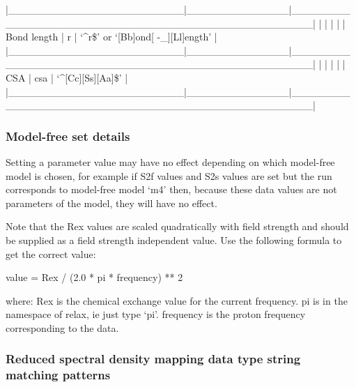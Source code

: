 |\_\_\_\_\_\_\_\_\_\_\_\_\_\_\_\_\_\_\_\_\_\_\_\_|\_\_\_\_\_\_\_\_\_\_\_\_\_\_|\_\_\_\_\_\_\_\_\_\_\_\_\_\_\_\_\_\_\_\_\_\_\_\_\_\_\_\_\_\_\_\_\_\_\_\_\_\_\_\_\_\_\_\_\_\_\_\_\_\_|
|                        |              |                                                  |
| Bond length            | r            | `\^{}r\$' or `[Bb]ond[ -\_][Ll]ength'                 |
|\_\_\_\_\_\_\_\_\_\_\_\_\_\_\_\_\_\_\_\_\_\_\_\_|\_\_\_\_\_\_\_\_\_\_\_\_\_\_|\_\_\_\_\_\_\_\_\_\_\_\_\_\_\_\_\_\_\_\_\_\_\_\_\_\_\_\_\_\_\_\_\_\_\_\_\_\_\_\_\_\_\_\_\_\_\_\_\_\_|
|                        |              |                                                  |
| CSA                    | csa          | `\^{}[Cc][Ss][Aa]\$'                                 |
|\_\_\_\_\_\_\_\_\_\_\_\_\_\_\_\_\_\_\_\_\_\_\_\_|\_\_\_\_\_\_\_\_\_\_\_\_\_\_|\_\_\_\_\_\_\_\_\_\_\_\_\_\_\_\_\_\_\_\_\_\_\_\_\_\_\_\_\_\_\_\_\_\_\_\_\_\_\_\_\_\_\_\_\_\_\_\_\_\_|



\subsubsection{Model-free set details}

Setting a parameter value may have no effect depending on which model-free model is chosen,
for example if S2f values and S2s values are set but the run corresponds to model-free model
`m4' then, because these data values are not parameters of the model, they will have no
effect.

Note that the Rex values are scaled quadratically with field strength and should be supplied
as a field strength independent value.  Use the following formula to get the correct value:

    value = Rex / (2.0 * pi * frequency) ** 2

where:
    Rex is the chemical exchange value for the current frequency.
    pi is in the namespace of relax, ie just type `pi'.
    frequency is the proton frequency corresponding to the data.



\subsubsection{Reduced spectral density mapping data type string matching patterns}



